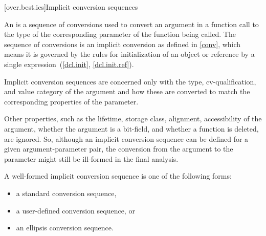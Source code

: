 [over.best.ics]{Implicit conversion sequences}%

\pnum
An 
is a sequence of conversions used
to convert an argument in a function call to the type of the
corresponding parameter of the function being called.
The
sequence of conversions is an implicit conversion as defined in
\ref{conv}, which means it is governed by the rules for
initialization of an object or reference by a single
expression~(\ref{dcl.init}, \ref{dcl.init.ref}).

\pnum
Implicit conversion sequences are concerned only with the type,
cv-qualification, and value category of the argument and how these
are converted to match the corresponding properties of the
parameter.
\begin{note}
Other properties, such as the lifetime, storage class,
alignment, accessibility of the argument, whether the argument is a bit-field,
and whether a function is deleted, are ignored.
So, although an implicit
conversion sequence can be defined for a given argument-parameter
pair, the conversion from the argument to the parameter might still
be ill-formed in the final analysis.
\end{note}

\pnum
A
well-formed implicit conversion
sequence is one of the following forms:

\begin{itemize}
\item
a standard conversion sequence,
\item
a user-defined conversion sequence, or
\item
an ellipsis conversion sequence.
\end{itemize}

